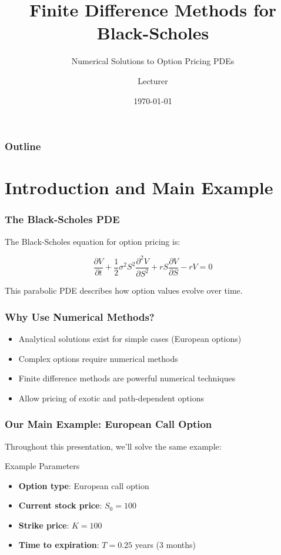 \documentclass[aspectratio=169]{beamer}
\title{Finite Difference Methods for Black-Scholes}
\subtitle{Numerical Solutions to Option Pricing PDEs}
\author{Lecturer}
\date{\today}
\begin{document}
\begin{frame}
\titlepage
\end{frame}

\begin{frame}
\frametitle{Outline}
\tableofcontents
\end{frame}

\section{Introduction and Main Example}

\begin{frame}
\frametitle{The Black-Scholes PDE}
The Black-Scholes equation for option pricing is:

\[\frac{\partial V}{\partial t} + \frac{1}{2}\sigma^2 S^2 \frac{\partial^2 V}{\partial S^2} + rS \frac{\partial V}{\partial S} - rV = 0\]

This parabolic PDE describes how option values evolve over time.
\end{frame}

\begin{frame}
\frametitle{Why Use Numerical Methods?}
\begin{itemize}
\item Analytical solutions exist for simple cases (European options)
\item Complex options require numerical methods
\item Finite difference methods are powerful numerical techniques
\item Allow pricing of exotic and path-dependent options
\end{itemize}
\end{frame}

\begin{frame}
\frametitle{Our Main Example: European Call Option}
Throughout this presentation, we'll solve the same example:

\begin{block}{Example Parameters}
\begin{itemize}
\item \textbf{Option type}: European call option
\item \textbf{Current stock price}: \(S_0 = 100\)
\item \textbf{Strike price}: \(K = 100\)
\item \textbf{Time to expiration}: \(T = 0.25\) years (3 months)
\end{itemize}
\end{block}
\end{frame}
\end{document}

